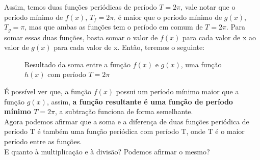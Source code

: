 Assim, temos duas funções periódicas de período $T = 2\pi$, vale notar que o período mínimo 
de $f(x)$, $T_f = 2\pi$, é maior que o período mínimo de $g(x)$, $T_g = \pi$, mas
que ambas as funções tem o período em comum de $T = 2\pi$. Para somar essas duas
funções, basta somar o valor de $f(x)$ para cada valor de x ao valor de $g(x)$ para 
cada valor de x. Então, teremos o seguinte:
\begin{figure}[H]
    \caption{Resultado da soma entre a função $f(x)$ e $g(x)$, uma função $h(x)$ com período $T = 2\pi$}
    \label{fig:addExp}
\end{figure}

É possível ver que, a função $f(x)$ possui um período mínimo maior que a função $g(x)$,
assim, \textbf{a função resultante é uma função de período mínimo $T = 2\pi$}, a 
subtração funciona de forma semelhante.\\

Agora podemos afirmar que a soma e a diferença de duas funções 
periódica de período T é também uma função periódica com período T, onde
T é o maior período entre as funções.\\

E quanto à multiplicação e à divisão? Podemos afirmar o mesmo?\\


